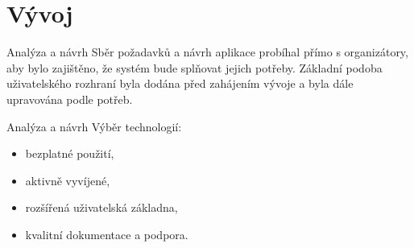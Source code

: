 \documentclass[czech,aspectratio=169]{beamer}
\begin{document}
  \section{Vývoj}

  \begin{frame}{Analýza a návrh}
    Sběr požadavků a návrh aplikace probíhal přímo s organizátory, aby bylo zajištěno, že systém bude splňovat jejich potřeby.
    \linebreak
    \linebreak
    Základní podoba uživatelského rozhraní byla dodána před zahájením vývoje a byla dále upravována podle potřeb.
  \end{frame}

  \begin{frame}{Analýza a návrh}
    Výběr technologií:
    \begin{itemize}
      \item bezplatné použití,
      \item aktivně vyvíjené,
      \item rozšířená uživatelská základna,
      \item kvalitní dokumentace a podpora.
    \end{itemize}
  \end{frame}
\end{document}
